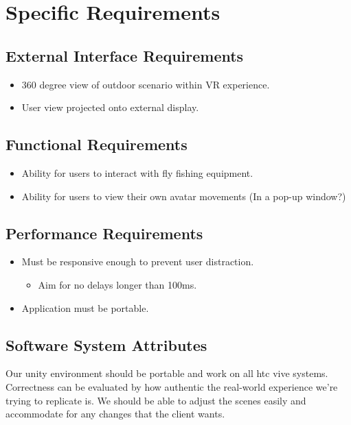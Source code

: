 \documentclass[10pt, oneside,onecolumn,draftclsnofoot]{IEEEtran}
\begin{document}
\section{Specific Requirements}
\subsection{External Interface Requirements}
\begin{itemize}
  \item 360 degree view of outdoor scenario within VR experience.
  \item User view projected onto external display.
\end{itemize}

\subsection{Functional Requirements}
\begin{itemize}
  \item Ability for users to interact with fly fishing equipment.
  \item Ability for users to view their own avatar movements (In a pop-up
  window?)
\end{itemize}

\subsection{Performance Requirements}
\begin{itemize}
  \item Must be responsive enough to prevent user distraction.
  \begin{itemize}
    \item Aim for no delays longer than 100ms.
  \end{itemize}
  \item Application must be portable.
\end{itemize}

\subsection{Software System Attributes}
Our unity environment should be portable and work on all htc vive systems.
Correctness can be evaluated by how authentic the real-world experience we're
trying to replicate is. We should be able to adjust the scenes easily and
accommodate for any changes that the client wants.
\end{document}
